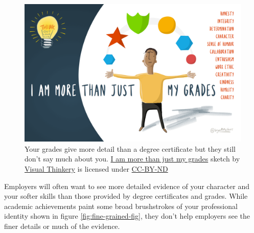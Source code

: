 \documentclass[
]{book}
\begin{document}
\begin{figure}

{\centering \includegraphics[width=1\linewidth]{images/i-am-more-than-just-my-grades} 

}

\caption{Your grades give more detail than a degree certificate but they still don't say much about you. \href{https://bryanmmathers.com/i-am-more-than-just-my-grades/}{I am more than just my grades} sketch by \href{https://visualthinkery.com/}{Visual Thinkery} is licensed under \href{https://creativecommons.org/licenses/by-nd/4.0/}{CC-BY-ND}}\label{fig:more-than-grades-fig}
\end{figure}



Employers will often want to see more detailed evidence of your character and your softer skills than those provided by degree certificates and grades. While academic achievements paint some broad brushstrokes of your professional identity shown in figure \ref{fig:fine-grained-fig}, they don't help employers see the finer details or much of the evidence.
\end{document}
